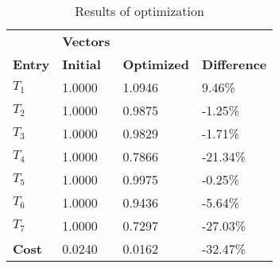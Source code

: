 \begin{table}[H]
\centering
\begin{tabular}{llll}
\textbf{}      & \cellcolor[HTML]{EFEFEF}\textbf{Vectors} & \textbf{} & \textbf{}         \\
\rowcolor[HTML]{EFEFEF} 
\textbf{Entry} & \textbf{Initial} & \textbf{Optimized} & \textbf{Difference} \\
$T_1$ & 1.0000 & 1.0946 & 9.46\% \\ 
$T_2$ & 1.0000 & 0.9875 & -1.25\% \\ 
$T_3$ & 1.0000 & 0.9829 & -1.71\% \\ 
$T_4$ & 1.0000 & 0.7866 & -21.34\% \\ 
$T_5$ & 1.0000 & 0.9975 & -0.25\% \\ 
$T_6$ & 1.0000 & 0.9436 & -5.64\% \\ 
$T_7$ & 1.0000 & 0.7297 & -27.03\% \\ 
\rowcolor[HTML]{EFEFEF} 
\textbf{Cost}  & 0.0240 & 0.0162 & -32.47\% \\ 
\end{tabular}
\caption{Results of optimization}
\label{tab:OptimizationAnalysis}
\end{table}